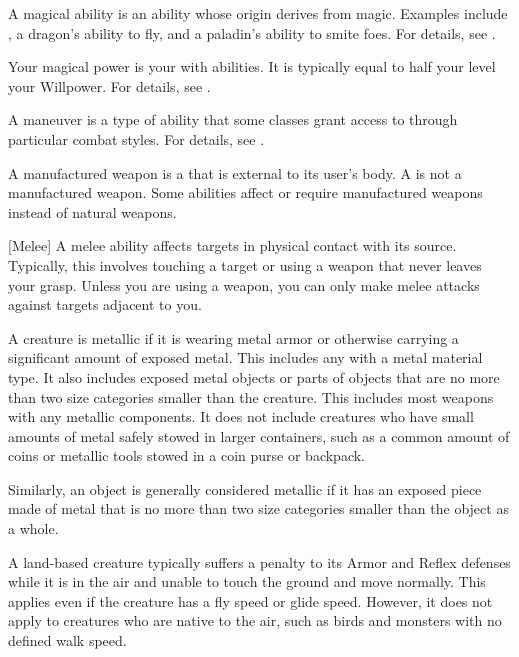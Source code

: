  A magical ability is an ability whose origin derives from magic.
Examples include , a dragon's ability to fly, and a paladin's ability to smite foes.
For details, see .

 Your magical power is your  with \magical abilities.
It is typically equal to half your level \add your Willpower.
For details, see .

 A maneuver is a type of  ability that some classes grant access to through particular combat styles.
For details, see .

 A manufactured weapon is a  that is external to its user's body.
A  is not a manufactured weapon.
Some abilities affect or require manufactured weapons instead of natural weapons.

[Melee] A melee ability affects targets in physical contact with its source.
Typically, this involves touching a target or using a weapon that never leaves your grasp.
Unless you are using a  weapon, you can only make melee attacks against targets adjacent to you.

 A creature is metallic if it is wearing metal armor or otherwise carrying a significant amount of exposed metal.
This includes any  with a metal material type.
It also includes exposed metal objects or parts of objects that are no more than two size categories smaller than the creature.
This includes most weapons with any metallic components.
It does not include creatures who have small amounts of metal safely stowed in larger containers, such as a common amount of coins or metallic tools stowed in a coin purse or backpack.

Similarly, an object is generally considered metallic if it has an exposed piece made of metal that is no more than two size categories smaller than the object as a whole.

 A land-based creature typically suffers a  penalty to its Armor and Reflex defenses while it is in the air and unable to touch the ground and move normally.
This applies even if the creature has a fly speed or glide speed.
However, it does not apply to creatures who are native to the air, such as birds and monsters with no defined walk speed.

